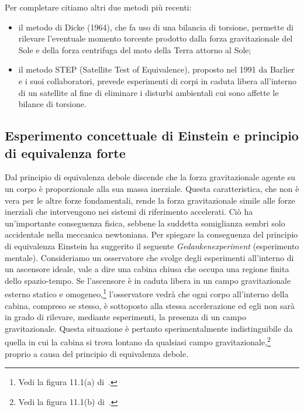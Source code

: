 Per completare citiamo altri due metodi più recenti:
\begin{itemize}
\item il metodo di Dicke (1964), che fa uso di una bilancia di torsione,
  permette di rilevare l'eventuale momento torcente prodotto dalla forza
  gravitazionale del Sole e della forza centrifuga del moto della Terra attorno
  al Sole;
\item il metodo STEP (Satellite Test of Equivalence), proposto nel 1991 da
  Barlier e i suoi collaboratori, prevede esperimenti di corpi in caduta libera
  all'interno di un satellite al fine di eliminare i disturbi ambientali cui
  sono affette le bilance di torsione.
\end{itemize}

\subsection[Principio di equivalenza forte]{Esperimento concettuale di Einstein
  e principio di equivalenza forte}
\label{sec:esperim-concet-einstein}

Dal principio di equivalenza debole discende che la forza gravitazionale agente
su un corpo è proporzionale alla sua massa inerziale.  Questa caratteristica,
che non è vera per le altre forze fondamentali, rende la forza gravitazionale
simile alle forze inerziali che intervengono nei sistemi di riferimento
accelerati.  Ciò ha un'importante conseguenza fisica, sebbene la suddetta
somiglianza sembri solo accidentale nella meccanica newtoniana.  Per spiegare la
conseguenza del principio di equivalenza Einstein ha suggerito il seguente
\emph{Gedankenexperiment} (esperimento mentale).  Consideriamo un osservatore
che svolge degli esperimenti all'interno di un ascensore ideale, vale a dire una
cabina chiusa che occupa una regione finita dello spazio-tempo.  Se l'ascensore
è in caduta libera in un campo gravitazionale esterno statico e
omogeneo,\footnote{Vedi la figura 11.1(a) di~\textcite[466]{barone:relativita}.}
l'osservatore vedrà che ogni corpo all'interno della cabina, compreso se stesso,
è sottoposto alla stessa accelerazione ed egli non sarà in grado di rilevare,
mediante esperimenti, la presenza di un campo gravitazionale.  Questa situazione
è pertanto sperimentalmente indistinguibile da quella in cui la cabina si trova
lontano da qualsiasi campo
gravitazionale,\footnote{Vedi la figura 11.1(b)
  di~\textcite[466]{barone:relativita}.}
proprio a causa del principio di equivalenza debole.

